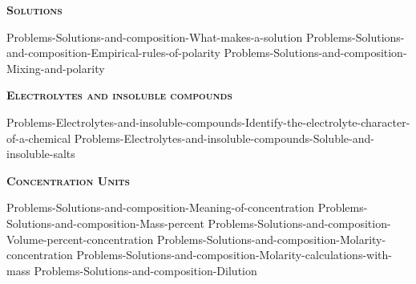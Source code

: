 \documentclass[main.tex]{subfiles}
\newcommand\chapterlabel{Ch-electrolytes}
\begin{document}
\newpage
\setdoublesep{0.35700 em}  %
\setatomsep{1.78500 em}    %
\setbondoffset{0.18265 em} %
\renewcommand{\bondwidth}{0.06642 em} %
\setbondstyle{line width = \bondwidth}
\fancyhfoffset[E,O]{0pt}
\setlength{\columnsep}{30pt}
\begin{conclusion}
\iftoggle{chem121}{}{\setcounter{chapter}{5}}
\iftoggle{chem121}{\setcounter{chapter}{8}}{}
\end{conclusion}
\begin{multicols*}{2}\setcounter{numA}{1}  %

{\raggedright\textsc{\textbf{Solutions }}\par}
{Problems-Solutions-and-composition-What-makes-a-solution}
{Problems-Solutions-and-composition-Empirical-rules-of-polarity}
{Problems-Solutions-and-composition-Mixing-and-polarity}


{\raggedright\textsc{\textbf{Electrolytes and insoluble compounds}}\par}
\iftoggle{chem121}{}{
{Problems-Electrolytes-and-insoluble-compounds-Breaking-down-electrolytes-into-ions}%
}
{Problems-Electrolytes-and-insoluble-compounds-Identify-the-electrolyte-character-of-a-chemical}
{Problems-Electrolytes-and-insoluble-compounds-Soluble-and-insoluble-salts}


{\raggedright\textsc{\textbf{Concentration Units }}\par}
{Problems-Solutions-and-composition-Meaning-of-concentration}
{Problems-Solutions-and-composition-Mass-percent}
{Problems-Solutions-and-composition-Volume-percent-concentration}
{Problems-Solutions-and-composition-Molarity-concentration}
{Problems-Solutions-and-composition-Molarity-calculations-with-mass}
{Problems-Solutions-and-composition-Dilution}




\end{multicols*}
\end{document}
